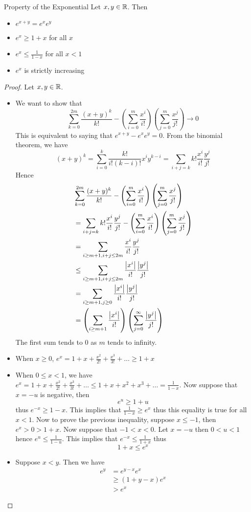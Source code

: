 \documentclass[a4paper]{article}
\begin{document}
\begin{thm}{Property of the Exponential}{} Let $x,y\in\mathbb{R}$. Then 
\begin{itemize}
\item $e^{x+y}=e^xe^y$
\item $e^x\geq 1+x$ for all $x$
\item $e^x\leq\frac{1}{1-x}$ for all $x<1$
\item $e^x$ is strictly increasing
\end{itemize}\tcbline
\begin{proof} Let $x,y\in\mathbb{R}$. 
\begin{itemize}
\item We want to show that $$\sum_{k=0}^{2m}\frac{(x+y)^k}{k!}-\left(\sum_{i=0}^m\frac{x^i}{i!}\right)\left(\sum_{j=0}^m\frac{x^j}{j!}\right)\to0$$ This is equivalent to saying that $e^{x+y}-e^xe^y=0$. From the binomial theorem, we have $$(x+y)^k=\sum_{i=0}^k\frac{k!}{i!(k-i)!}x^iy^{k-i}=\sum_{i+j=k}k!\frac{x^i}{i!}\frac{y^j}{j!}$$ Hence
\begin{align*}
&\sum_{k=0}^{2m}\frac{(x+y)^k}{k!}-\left(\sum_{i=0}^m\frac{x^i}{i!}\right)\left(\sum_{j=0}^m\frac{x^j}{j!}\right)\\
&=\sum_{i+j=k}k!\frac{x^i}{i!}\frac{y^j}{j!}-\left(\sum_{i=0}^m\frac{x^i}{i!}\right)\left(\sum_{j=0}^m\frac{x^j}{j!}\right)\\
&=\sum_{i\geq m+1,i+j\leq 2m}\frac{x^i}{i!}\frac{y^j}{j!}\\
&\leq\sum_{i\geq m+1,i+j\leq 2m}\frac{\abs{x^i}}{i!}\frac{\abs{y^j}}{j!}\\
&=\sum_{i\geq m+1,j\geq0}\frac{\abs{x^i}}{i!}\frac{\abs{y^j}}{j!}\\
&=\left(\sum_{i\geq m+1}\frac{\abs{x^i}}{i!}\right)\left(\sum_{j=0}^\infty\frac{\abs{y^j}}{j!}\right)
\end{align*} The first sum tends to $0$ as $m$ tends to infinity. 
\item When $x\geq0$, $e^x=1+x+\frac{x^2}{2!}+\frac{x^3}{3!}+\dots\geq 1+x$
\item When $0\leq x<1$, we have $e^x=1+x+\frac{x^2}{2!}+\frac{x^3}{3!}+\dots\leq1+x+x^2+x^3+\dots=\frac{1}{1-x}$. Now suppose that $x=-u$ is negative, then $$e^u\geq1+u$$ thus $e^{-x}\geq1-x$. This implies that $\frac{1}{1-x}\geq e^x$ thus this equality is true for all $x<1$. Now to prove the previous inequality, suppose $x\leq-1$, then $e^x>0>1+x$. Now suppose that $-1<x<0$. Let $x=-u$ then $0<u<1$ hence $e^u\leq\frac{1}{1-u}$. This implies that $e^{-x}\leq\frac{1}{1+x}$ thus $$1+x\leq e^x$$
\item Suppose $x<y$. Then we have
\begin{align*}
e^y&=e^{y-x}e^x\\
&\geq(1+y-x)e^x\\
&>e^x
\end{align*}
\end{itemize}
\end{proof}
\end{thm}
\end{document}
